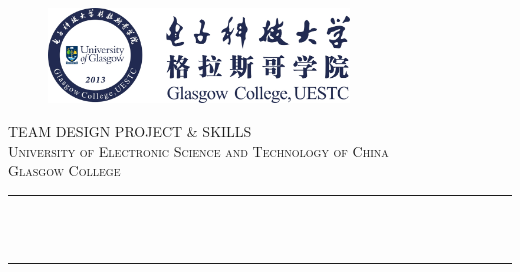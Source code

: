 \begin{titlepage}

\newcommand{\HRule}{\rule{\linewidth}{0.5mm}} %

\begin{figure}[t]
    \flushright
    \includegraphics[width=8cm]{title/logo.eps}\\[1cm] %
\end{figure}

 

\center %


\textsc{\LARGE TEAM DESIGN PROJECT \& SKILLS}\\[1.5cm] %
\textsc{\Large University of Electronic Science and Technology of China}\\[0.5cm] %
\textsc{\large Glasgow College}\\[0.5cm] %

\makeatletter
\HRule \\[0.4cm]
{ \huge \bfseries \@title}\\[0.4cm] %
\HRule \\[1.5cm]
 


\end{titlepage}

